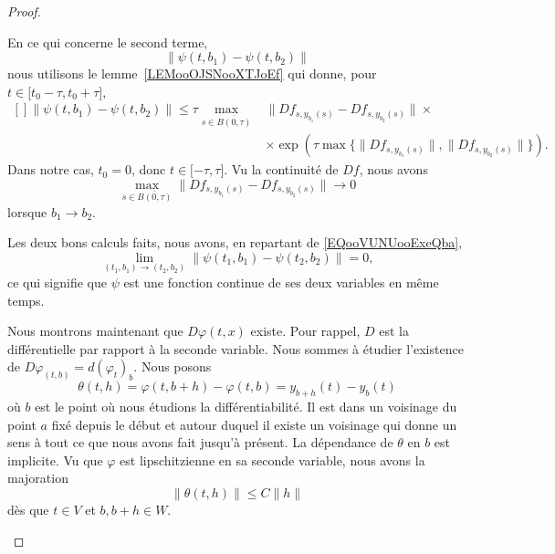 \begin{proof}
\begin{subproof}
\begin{subproof}
			En ce qui concerne le second terme,
			\begin{equation}
				\| \psi(t,b_1)-\psi(t,b_2) \|
			\end{equation}
			nous utilisons le lemme~\ref{LEMooOJSNooXTJoEf} qui donne, pour \( t\in\mathopen[ t_0 -\tau, t_0+\tau \mathclose]\),
			\begin{equation}
				\begin{aligned}[]
					\| \psi(t,b_1)-\psi(t,b_2) \|\leq\tau\max_{s\in \overline{ B(0,\tau) }} & \| Df_{s,y_{b_1}(s)}-Df_{s,y_{b_2}(s)} \|\times                                          \\
					                                                                        & \times \exp\left( \tau\max\{ \| Df_{s,y_{b_1}(s)}\|, \| Df_{s,y_{b_2}(s)} \| \} \right).
				\end{aligned}
			\end{equation}
			Dans notre cas, \( t_0=0\), donc \( t\in\mathopen[ -\tau , \tau \mathclose]\). Vu la continuité de \( Df\), nous avons
			\begin{equation}
				\max_{s\in \overline{ B(0,\tau) }}\| Df_{s,y_{b_1}(s)}-Df_{s,y_{b_2}(s)} \|\to 0
			\end{equation}
			lorsque \( b_1\to b_2\).


			Les deux bons calculs faits, nous avons, en repartant de \eqref{EQooVUNUooExeQba},
			\begin{equation}
				\lim_{(t_1,b_1)\to(t_2,b_2)}\| \psi(t_1,b_1)-\psi(t_2,b_2) \|=0,
			\end{equation}
			ce qui signifie que \( \psi\) est une fonction continue de ses deux variables en même temps.
		\end{subproof}


		Nous montrons maintenant que \( D\varphi(t,x)\) existe. Pour rappel, \( D\) est la différentielle par rapport à la seconde variable. Nous sommes à étudier l'existence de \( D\varphi_{(t,b)}=d(\varphi_t)_b\). Nous posons
		\begin{equation}
			\theta(t,h)=\varphi(t,b+h)-\varphi(t,b)=y_{b+h}(t)-y_b(t)
		\end{equation}
		où \( b\) est le point où nous étudions la différentiabilité. Il est dans un voisinage du point \( a\) fixé depuis le début et autour duquel il existe un voisinage qui donne un sens à tout ce que nous avons fait jusqu'à présent. La dépendance de \( \theta\) en \( b\) est implicite. Vu que \( \varphi\) est lipschitzienne en sa seconde variable, nous avons la majoration
		\begin{equation}        \label{EQooKYELooZlfeed}
			\| \theta(t,h) \|\leq C\| h \|
		\end{equation}
		dès que \( t\in V\) et \( b,b+h\in W\).


\end{subproof}
\end{proof}
